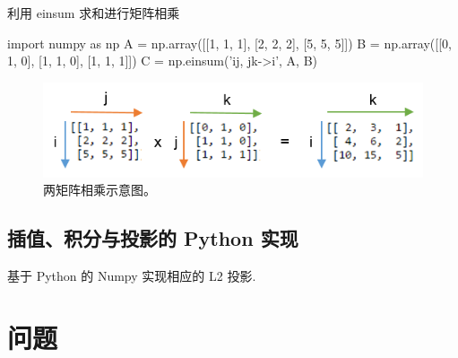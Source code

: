 \documentclass{article}
\begin{document}
\begin{listing}[H]
    \caption{利用 einsum 求和进行矩阵相乘}
    \begin{pythoncode}
        import numpy as np
        A = np.array([[1, 1, 1], [2, 2, 2], [5, 5, 5]])
        B = np.array([[0, 1, 0], [1, 1, 0], [1, 1, 1]])
        C = np.einsum('ij, jk->i', A, B)
    \end{pythoncode}
\end{listing}

\begin{figure}[ht!]
    \centering
    \includegraphics[scale=2]{./figures/twomat.png}
    \caption{两矩阵相乘示意图。}
    \label{fig:twomat}
\end{figure}

\subsection{插值、积分与投影的 Python 实现}
基于 Python 的 Numpy 实现相应的 L2 投影.

\section{问题}

\cite{fem_2010}


\end{document}
